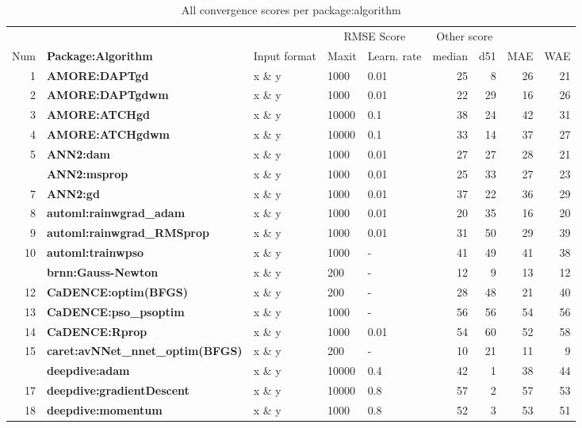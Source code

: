 \begin{Schunk}
\begin{table}

\caption{\label{tab:unnamed-chunk-3}All convergence scores per package:algorithm}
\centering
\fontsize{8}{10}\selectfont
\begin{tabular}[t]{r>{\bfseries}llllrrrr}
\toprule
\multicolumn{2}{c}{ } & \multicolumn{3}{c}{Input parameter} & \multicolumn{2}{c}{RMSE Score} & \multicolumn{2}{c}{Other score} \\
\cmidrule(l{3pt}r{3pt}){3-5} \cmidrule(l{3pt}r{3pt}){6-7} \cmidrule(l{3pt}r{3pt}){8-9}
Num & Package:Algorithm & Input format & Maxit & Learn. rate & median & d51 & MAE & WAE\\
\midrule
1 & AMORE:DAPTgd & x \& y & 1000 & 0.01 & 25 & 8 & 26 & 21\\
2 & AMORE:DAPTgdwm & x \& y & 1000 & 0.01 & 22 & 29 & 16 & 26\\
3 & AMORE:ATCHgd & x \& y & 10000 & 0.1 & 38 & 24 & 42 & 31\\
4 & AMORE:ATCHgdwm & x \& y & 10000 & 0.1 & 33 & 14 & 37 & 27\\
5 & ANN2:dam & x \& y & 1000 & 0.01 & 27 & 27 & 28 & 21\\
\addlinespace
6 & ANN2:msprop & x \& y & 1000 & 0.01 & 25 & 33 & 27 & 23\\
7 & ANN2:gd & x \& y & 1000 & 0.01 & 37 & 22 & 36 & 29\\
8 & automl:rainwgrad\_adam & x \& y & 1000 & 0.01 & 20 & 35 & 16 & 20\\
9 & automl:rainwgrad\_RMSprop & x \& y & 1000 & 0.01 & 31 & 50 & 29 & 39\\
10 & automl:trainwpso & x \& y & 1000 & - & 41 & 49 & 41 & 38\\
\addlinespace
11 & brnn:Gauss-Newton & x \& y & 200 & - & 12 & 9 & 13 & 12\\
12 & CaDENCE:optim(BFGS) & x \& y & 200 & - & 28 & 48 & 21 & 40\\
13 & CaDENCE:pso\_psoptim & x \& y & 1000 & - & 56 & 56 & 54 & 56\\
14 & CaDENCE:Rprop & x \& y & 1000 & 0.01 & 54 & 60 & 52 & 58\\
15 & caret:avNNet\_nnet\_optim(BFGS) & x \& y & 200 & - & 10 & 21 & 11 & 9\\
\addlinespace
16 & deepdive:adam & x \& y & 10000 & 0.4 & 42 & 1 & 38 & 44\\
17 & deepdive:gradientDescent & x \& y & 10000 & 0.8 & 57 & 2 & 57 & 53\\
18 & deepdive:momentum & x \& y & 1000 & 0.8 & 52 & 3 & 53 & 51\\

\end{tabular}
\end{table}
\end{Schunk}
